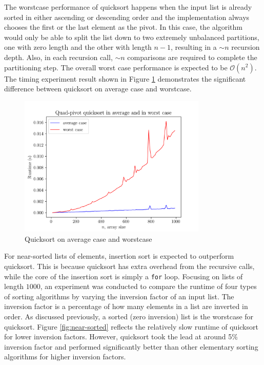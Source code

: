 \documentclass[titlepage, 12pt]{article}
\begin{document}
The worstcase performance of quicksort happens when the input list is already
sorted in either ascending or descending order and the implementation always
chooses the first or the last element as the pivot. In this case, the algorithm
would only be able to split the list down to two extremely unbalanced
partitions, one with zero length and the other with length \( n - 1 \),
resulting in a \( \sim n \) recursion depth. Also, in each recursion call, \(
\sim n \) comparisons are required to complete the partitioning step. The
overall worst case performance is expected to be \( \mathcal{O}(n^2) \). The
timing experiment result shown in Figure \ref{fig:worst} demonstrates the
significant difference between quicksort on average case and worstcase.

\begin{figure}[h]
  \centering
  \includegraphics[width=0.8\textwidth]{worst} 
  \caption{Quicksort on average case and worstcase}
  \label{fig:worst}
\end{figure}

For near-sorted lists of elements, insertion sort is expected to outperform
quicksort. This is because quicksort has extra overhead from the recursive
calls, while the core of the insertion sort is simply a \texttt{for} loop.
Focusing on lists of length \( 1000 \), an experiment was conducted to compare
the runtime of four types of sorting algorithms by varying the inversion factor
of an input list. The inversion factor is a percentage of how many elements in a
list are inverted in order. As discussed previously, a sorted (zero inversion)
list is the worstcase for quicksort. Figure \ref{fig:near-sorted} reflects the
relatively slow runtime of quicksort for lower inversion factors. However,
quicksort took the lead at around 5\% inversion factor and performed
significantly better than other elementary sorting algorithms for higher
inversion factors.
\end{document}
